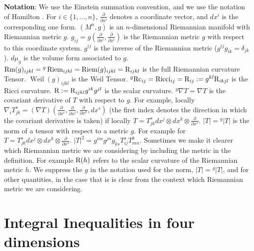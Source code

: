 \documentclass{amsart}
\numberwithin{equation}{section}
\theoremstyle{definition}
\theoremstyle{remark}
\begin{document}
\hfill\break
{\bf Notation}:
\hfill\break
We use the Einstein  summation convention, and
we use the notation of Hamilton \cite{HaThree}.\hfill\break
For $i \in \{1,\ldots,n\}$,
$ {\frac{\partial {} } {\partial {x^i}} }$ denotes a coordinate vector, and $dx^i$  is the corresponding one
form.\hfill\break
$(M^n,g)$ is an $n$-dimensional  Riemannian manifold with Riemannian metric $g$.
\hfill\break
$g_{ij} = g({\frac{\partial {} } {\partial {x^i}} },{\frac{\partial {} } {\partial {x^i}} }) $ is the Riemannian metric $g$
with respect to this coordinate system.\hfill\break
$g^{ij}$ is the inverse of the Riemannian metric ($g^{ij}g_{ik} = \delta_{jk}$).\hfill\break
$d\mu_{g}$ is the volume form associated to $g$.\hfill\break
$\operatorname{Rm}(g)_{ijkl} = {{}^g\operatorname{Riem}}_{ijkl} = \operatorname{Riem}(g)_{ijkl} = {{\rm R}}_{ijkl}$ is the full
Riemannian curvature Tensor.\hfill\break
$\operatorname{Weil}(g)_{ijkl}$ is the Weil Tensor.\hfill\break
${{}^g{{\rm{Rc}}}}_{ij} = {{\rm{Ricci}}}_{ij} = {{\rm R}}_{ij}:= g^{kl}{{\rm R}}_{ikjl}$ is the Ricci curvature.\hfill\break
${{\rm R}}:= {{\rm R}}_{ijkl}g^{ik}g^{jl}$ is the scalar curvature. \hfill\break
${}^{g}{\nabla} T = {\nabla} T$ is the covariant derivative of $T$ with respect to $g$. For example,
locally ${\nabla}_i T_{jk}^s = ({\nabla} T)( {\frac{\partial {} } {\partial {x^i}} }, 
{\frac{\partial {} } {\partial {x^j}} }, {\frac{\partial {} } {\partial {x^k}} }, d x^s)$
(the first index denotes the direction in which the covariant derivative
is taken) if locally $T = T_{jk}^s dx^j \otimes dx^k \otimes {\frac{\partial {} } {\partial {x^s}} }$. \hfill\break
$|T| = {{}^g|T|}$ 
is the norm of a tensor with respect to a metric $g$. For example
for $T = T_{jk}^s dx^j \otimes dx^k \otimes {\frac{\partial {} } {\partial {x^s}} }$.
$|T|^2 = g^{im}g^{jn}g_{ks} T_{ij}^s T_{mn}^k$.\hfill\break
Sometimes we  make it clearer which Riemannian metric we are considering by
including the metric in the definition.
For example ${{\rm R}}(h)$ refers to the scalar curvature of the Riemannian
metric $h$.\hfill\break
We suppress the $g$ in the notation used for the norm, $|T| = {}^g|T| $,
and for other quantities,
in the case that is is clear from the context which Riemannian metric
we are considering.\\

\section{Integral Inequalities in four dimensions}
\end{document}
